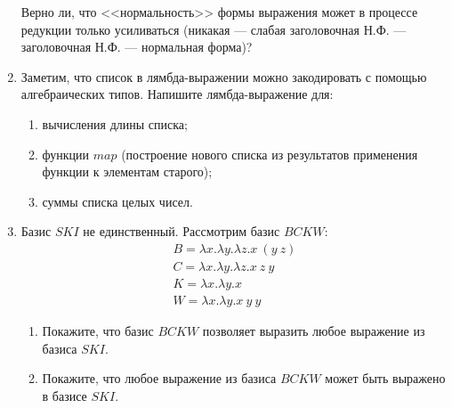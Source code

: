 \documentclass[10pt,a4paper,oneside]{article}
\begin{document}
\begin{enumerate}
Верно ли, что <<нормальность>> формы выражения может в процессе редукции только усиливаться
(никакая --- слабая заголовочная Н.Ф. --- заголовочная Н.Ф. --- нормальная форма)?

\item Заметим, что список в лямбда-выражении можно закодировать с помощью алгебраических типов.
Напишите лямбда-выражение для:
\begin{enumerate}
\item вычисления длины списка;
\item функции $map$ (построение нового списка из результатов применения функции к элементам старого);
\item суммы списка целых чисел.
\end{enumerate} 

\item Базис $SKI$ не единственный. Рассмотрим базис $BCKW$:
$$\begin{array}{l}B = \lambda x.\lambda y.\lambda z.x\ (y\ z)\\
C = \lambda x.\lambda y.\lambda z.x\ z\ y\\
K = \lambda x.\lambda y.x\\
W = \lambda x.\lambda y.x\ y\ y\end{array}$$

\begin{enumerate}
\item Покажите, что базис $BCKW$ позволяет выразить любое выражение из базиса $SKI$.
\item Покажите, что любое выражение из базиса $BCKW$ может быть выражено в базисе $SKI$.
\end{enumerate}
\end{enumerate}
\end{document}
